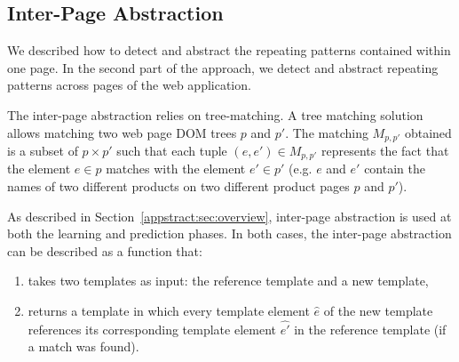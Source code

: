 

\subsection{Inter-Page Abstraction}\label{appstract:sec:inter}
We described how to detect and abstract the repeating patterns contained within one page. 
In the second part of the \textsc{\appstract{}} approach, we detect and abstract repeating patterns across pages of the web application.

The inter-page abstraction relies on tree-matching.
A tree matching solution allows matching two web page DOM trees $p$ and $p'$. 
The matching $M_{p, p'}$ obtained is a subset of  $p \times p'$ such that each tuple $(e, e') \in M_{p, p'}$ represents the fact that the element $e \in p$ matches with the element $e' \in p'$ (e.g. $e$ and $e'$ contain the names of two different products on two different product pages $p$ and $p'$).

As described in Section~\ref{appstract:sec:overview}, inter-page abstraction is used at both the learning and prediction phases. In both cases, the inter-page abstraction can be described as a function that:
\begin{enumerate}
    \item takes two templates as input: the reference template and a new template,
    \item returns a template in which every template element $\hat{e}$ of the new template references its corresponding template element $\hat{e'}$ in the reference template (if a match was found).
\end{enumerate}

